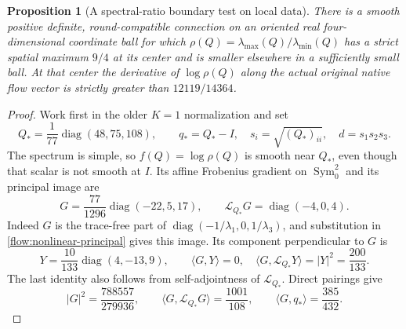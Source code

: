 \documentclass[11pt]{article}
\numberwithin{equation}{section}
\newtheorem{proposition}[theorem]{Proposition}
\theoremstyle{definition}
\theoremstyle{remark}
\DeclareMathOperator{\Sym}{Sym}
\begin{document}


\begin{proposition}[A spectral-ratio boundary test on local data]
\label{prop:spectral-ratio-local-maximum}
There is a smooth positive definite, round-compatible connection
on an oriented real four-dimensional coordinate ball for which
\(\rho(Q)=\lambda_{\max}(Q)/\lambda_{\min}(Q)\) has a strict
spatial maximum \(9/4\) at its center and is smaller elsewhere
in a sufficiently small ball. At that center the derivative
of \(\log\rho(Q)\) along the actual original native flow vector
is strictly greater than \(12119/14364\).
\end{proposition}
\begin{proof}
Work first in the older \(K=1\) normalization and set
\[
 Q_*=\frac1{77}\operatorname{diag}(48,75,108),\qquad
 q_*=Q_*-I,\quad s_i=\sqrt{(Q_*)_{ii}},\quad
 d=s_1s_2s_3.
\]
The spectrum is simple, so \(f(Q)=\log\rho(Q)\) is smooth
near \(Q_*\), even though that scalar is not smooth at \(I\).
Its affine Frobenius gradient on \(\Sym^2_0\) and its
principal image are
\[
 G=\frac{77}{1296}\operatorname{diag}(-22,5,17),\qquad
 \mathscr L_{Q_*}G=\operatorname{diag}(-4,0,4).
\]
Indeed \(G\) is the trace-free part of
\(\operatorname{diag}(-1/\lambda_1,0,1/\lambda_3)\),
and substitution in \eqref{flow:nonlinear-principal} gives
this image. Its component perpendicular to \(G\) is
\[
 Y=\frac{10}{133}\operatorname{diag}(4,-13,9),\qquad
 \langle G,Y\rangle=0,\quad
 \langle G,\mathscr L_{Q_*}Y\rangle=|Y|^2=\frac{200}{133}.
\]
The last identity also follows from self-adjointness of
\(\mathscr L_{Q_*}\). Direct pairings give
\[
 |G|^2=\frac{788557}{279936},\qquad
 \langle G,\mathscr L_{Q_*}G\rangle=\frac{1001}{108},\qquad
 \langle G,q_*\rangle=\frac{385}{432}.
\]


\end{proof}
\end{document}
